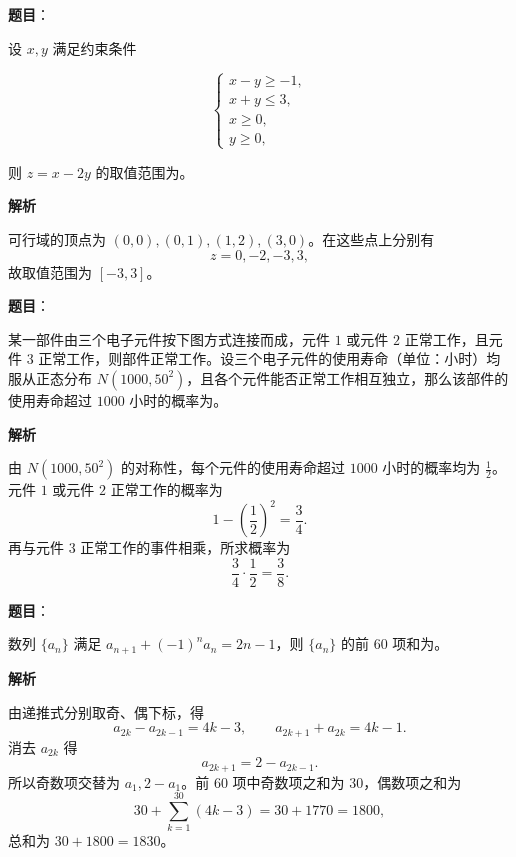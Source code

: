 \begin{answer}

\textbf{题目}：

设 $x,y$ 满足约束条件

\nopagebreak[4]
\[
\begin{cases}
x-y\geqslant-1,\\
x+y\leqslant3,\\
x\geqslant0,\\
y\geqslant0,
\end{cases}
\]

则 $z=x-2y$ 的取值范围为\gkblank{}。

\textbf{解析}

可行域的顶点为 $(0,0),(0,1),(1,2),(3,0)$。在这些点上分别有
\nopagebreak[4]
\[
z=0,-2,-3,3,
\]
故取值范围为 $[-3,3]$。


\end{answer}
\begin{answer}

\textbf{题目}：

某一部件由三个电子元件按下图方式连接而成，元件 $1$ 或元件 $2$ 正常工作，且元件 $3$ 正常工作，则部件正常工作。设三个电子元件的使用寿命（单位：小时）均服从正态分布 $N(1000,50^2)$，且各个元件能否正常工作相互独立，那么该部件的使用寿命超过 $1000$ 小时的概率为\gkblank{}。
\nopagebreak[4]
\begin{center}\end{center}
\nopagebreak[4]
\textbf{解析}

由 $N(1000,50^2)$ 的对称性，每个元件的使用寿命超过 $1000$ 小时的概率均为 $\frac12$。元件 $1$ 或元件 $2$ 正常工作的概率为
\nopagebreak[4]
\[
1-\left(\frac12\right)^2=\frac34.
\]
再与元件 $3$ 正常工作的事件相乘，所求概率为
\nopagebreak[4]
\[
\frac34\cdot\frac12=\frac38.
\]


\end{answer}
\begin{answer}

\textbf{题目}：

数列 $\{a_n\}$ 满足 $a_{n+1}+(-1)^n a_n=2n-1$，则 $\{a_n\}$ 的前 $60$ 项和为\gkblank{}。

\textbf{解析}

由递推式分别取奇、偶下标，得
\nopagebreak[4]
\[
a_{2k}-a_{2k-1}=4k-3,\qquad
a_{2k+1}+a_{2k}=4k-1.
\]
消去 $a_{2k}$ 得
\nopagebreak[4]
\[
a_{2k+1}=2-a_{2k-1}.
\]
所以奇数项交替为 $a_1,2-a_1$。前 $60$ 项中奇数项之和为 $30$，偶数项之和为
\nopagebreak[4]
\[
30+\sum_{k=1}^{30}(4k-3)=30+1770=1800,
\]
总和为 $30+1800=1830$。


\end{answer}
